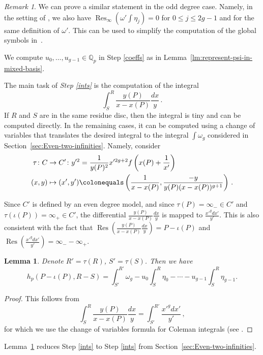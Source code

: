 \documentclass[11pt, a4paper]{amsart}
\newcommand{\Q}{\mathbb{Q}}
\newcommand{\Res}{\operatorname{Res}}
\newtheorem{lemma}[theorem]{Lemma}
\theoremstyle{remark}
\newtheorem{remark}[theorem]{Remark}
\numberwithin{equation}{section}
\newcommand{\sg}{{}}
\begin{document}
\begin{remark}\label{R:zero-residue-odd}
We can prove a similar statement in the odd degree case. Namely, in the
  setting of \cite[Proposition 5.12]{BBHeights}, we also have
  $\Res_{\infty}\left(\omega'\int\eta_j\right)=0$ for $0\leq j\leq 2g-1$ \sg{and for the same definition of $\omega'$}.
  This can be used to simplify the computation of the global symbols
  in~\cite[\S5.2]{BBHeights}.
\end{remark}

\sg{We compute $u_0,\ldots,u_{g-1}\in \Q_p$ in Step \eqref{coeffs} as in
Lemma~\ref{lm:represent-psi-in-mixed-basis}.}

The main task of {\it Step \eqref{ints}} is the computation of the integral 
$$\int_S^R
\dfrac{y(P)}{x-x(P)}\dfrac{dx}{y}\,.$$ 
If $R$ and $S$ are in the same residue disc, then the integral
is tiny and can be computed directly. In the remaining cases, it can be computed using a change of variables that translates the desired
integral to the integral $\int \omega_g$ 
considered in Section~\ref{sec:Even-two-infinities}.
Namely, consider
\begin{align}\label{eq:change-of-variables}
  \tau\colon C&\to C'\colon
  y'^2=\dfrac{1}{y(P)^2}x'^{2g+2}f\left(x(P)+\frac{1}{x'}\right)\\
  (x,y)&\mapsto(x',y')\colonequals\left(\dfrac{1}{x-x(P)},\dfrac{-y}{y(P)(x-x(P))^{g+1}}\right)\,.\nonumber
\end{align}

\sg{Since $C'$ is defined by an even degree model, and since
$\tau(P)=\infty_-\in C'$ and $\tau(\iota(P))=\infty_+\in C'$, the
differential $\frac{y(P)}{x-x(P)}\frac{dx}{y}$ is mapped to
$\frac{x'^gdx'}{y'}$. This is also consistent with the fact that $\Res(\frac{y(P)}{x-x(P)}\frac{dx}{y})=P-\iota(P)$ and $\Res(\frac{x'^gdx'}{y'})=\infty_- - \infty_+$.}

\begin{lemma}\label{L:change}
Denote $R'=\tau(R)$, $S'=\tau(S)$. Then we have 
\[
  h_p(P-\iota(P),R-S) = \int_{S'}^{R'} \omega_g - u_0\int_S^R \eta_0 -
  \cdots - u_{g-1}\int_S^R \eta_{g-1}.
\]
\end{lemma}
\begin{proof}
  This follows from 
\begin{equation}\label{Integral:ChangeOfVariables}
\int_S^R \dfrac{y(P)}{x-x(P)}\dfrac{dx}{y} = 
\int_{S'}^{R'} \dfrac{x'^gdx'}{y'}\,, 
\end{equation}
for which we use the change of variables formula for
  Coleman integrals  (see \cite[Section~2]{Coleman-deShalit}.
\end{proof}
Lemma~\ref{L:change} reduces Step \eqref{ints} to Step \eqref{ints}
from \sg{Section~\ref{sec:Even-two-infinities}}. 
\end{document}
